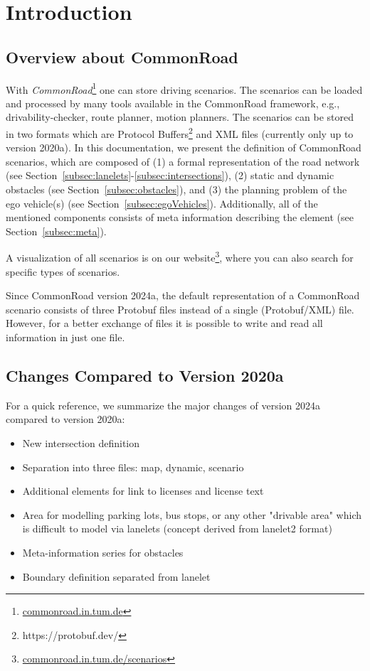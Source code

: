 \section{Introduction}
\label{sec:introduction}
\subsection{Overview about CommonRoad}
With \textit{CommonRoad}\cite{Althoff2017a}\footnote{\href{https://commonroad.in.tum.de}{commonroad.in.tum.de}} one can store driving scenarios. The scenarios can be loaded and processed by many tools available in the CommonRoad framework, e.g., drivability-checker, route planner, motion planners.  
The scenarios can be stored in two formats which are Protocol Buffers\footnote{https://protobuf.dev/} and XML files (currently only up to version 2020a). 
In this documentation, we present the definition of CommonRoad scenarios, which are composed of (1) a formal representation of the road network (see Section~\ref{subsec:lanelets}-\ref{subsec:intersections}), (2) static and dynamic obstacles (see Section~\ref{subsec:obstacles}), and (3) the planning problem of the ego vehicle(s) (see Section~\ref{subsec:egoVehicles}). 
Additionally, all of the mentioned components consists of meta information describing the element (see Section~\ref{subsec:meta}).

A visualization of all scenarios is on our website\footnote{\href{https://commonroad.in.tum.de/scenarios/}{commonroad.in.tum.de/scenarios}}, where you can also search for specific types of scenarios.

Since CommonRoad version 2024a, the default representation of a CommonRoad scenario consists of three Protobuf files instead of a  single (Protobuf/XML) file.
However, for a better exchange of files it is possible to write and read all information in just one file.


\subsection{Changes Compared to Version 2020a}

For a quick reference, we summarize the major changes of version 2024a compared to version 2020a:
\begin{itemize}
\item New intersection definition
\item Separation into three files: map, dynamic, scenario 
\item Additional elements for link to licenses and license text
\item Area for modelling parking lots, bus stops, or any other "drivable area" which is difficult to model via lanelets (concept derived from lanelet2 format)
\item Meta-information series for obstacles
\item Boundary definition separated from lanelet 
\end{itemize}

